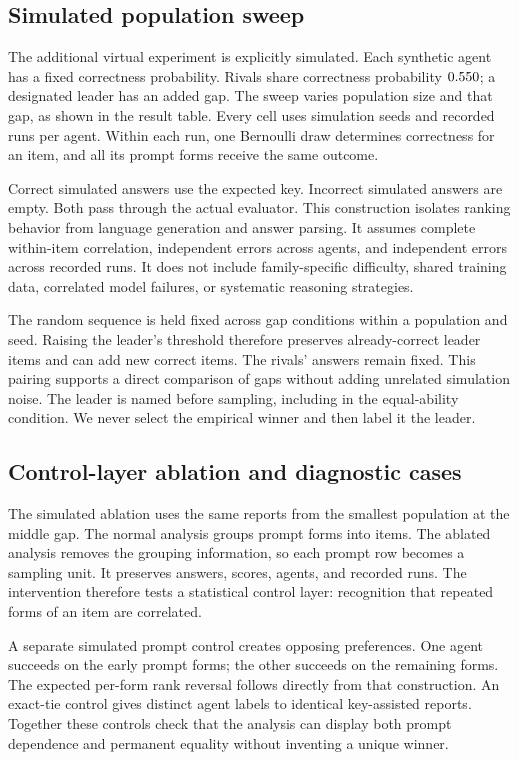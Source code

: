 \documentclass{article}
\begin{document}
\subsection{Simulated population sweep}
The additional virtual experiment is explicitly simulated. Each synthetic agent has a fixed correctness probability. Rivals share correctness probability $0.550$; a designated leader has an added gap. The sweep varies population size and that gap, as shown in the result table. Every cell uses \Seeds{} simulation seeds and \Runs{} recorded runs per agent. Within each run, one Bernoulli draw determines correctness for an item, and all its prompt forms receive the same outcome.\par
Correct simulated answers use the expected key. Incorrect simulated answers are empty. Both pass through the actual evaluator. This construction isolates ranking behavior from language generation and answer parsing. It assumes complete within-item correlation, independent errors across agents, and independent errors across recorded runs. It does not include family-specific difficulty, shared training data, correlated model failures, or systematic reasoning strategies.\par
The random sequence is held fixed across gap conditions within a population and seed. Raising the leader's threshold therefore preserves already-correct leader items and can add new correct items. The rivals' answers remain fixed. This pairing supports a direct comparison of gaps without adding unrelated simulation noise. The leader is named before sampling, including in the equal-ability condition. We never select the empirical winner and then label it the leader.\par
\subsection{Control-layer ablation and diagnostic cases}
The simulated ablation uses the same reports from the smallest population at the middle gap. The normal analysis groups prompt forms into items. The ablated analysis removes the grouping information, so each prompt row becomes a sampling unit. It preserves answers, scores, agents, and recorded runs. The intervention therefore tests a statistical control layer: recognition that repeated forms of an item are correlated.\par
A separate simulated prompt control creates opposing preferences. One agent succeeds on the early prompt forms; the other succeeds on the remaining forms. The expected per-form rank reversal follows directly from that construction. An exact-tie control gives distinct agent labels to identical key-assisted reports. Together these controls check that the analysis can display both prompt dependence and permanent equality without inventing a unique winner.\par
\end{document}
